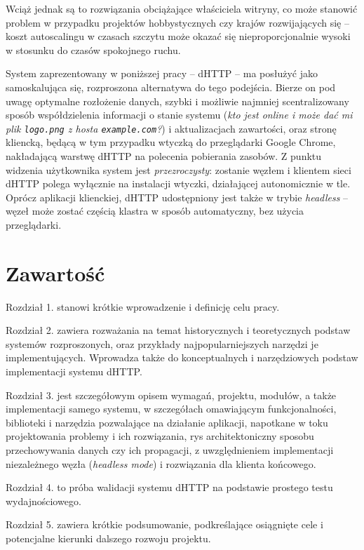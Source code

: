 Wciąż jednak są to rozwiązania obciążające właściciela witryny, co może stanowić problem w przypadku projektów hobbystycznych czy krajów rozwijających się -- koszt autoscalingu w czasach szczytu może okazać się nieproporcjonalnie wysoki w stosunku do czasów spokojnego ruchu.


System zaprezentowany w poniższej pracy -- dHTTP -- ma posłużyć jako samoskalująca się, rozproszona alternatywa do tego podejścia. Bierze on pod uwagę optymalne rozłożenie danych, szybki i możliwie najmniej scentralizowany sposób współdzielenia informacji o stanie systemu ({\em kto jest online i może dać mi plik \texttt{logo.png} z hosta \texttt{example.com}?}) i aktualizacjach zawartości, oraz stronę kliencką, będącą w tym przypadku wtyczką do przeglądarki Google Chrome, nakładającą warstwę dHTTP na polecenia pobierania zasobów. Z punktu widzenia użytkownika system jest {\em przezroczysty}: zostanie  węzłem i klientem sieci dHTTP polega wyłącznie na instalacji wtyczki, działającej autonomicznie w tle. Oprócz aplikacji klienckiej, dHTTP udostępniony jest także w trybie {\em headless} -- węzeł może zostać częścią klastra w sposób automatyczny, bez użycia przeglądarki.

\section{Zawartość}
\label{sec:zawartosc}

Rozdział 1. stanowi krótkie wprowadzenie i definicję celu pracy. 

Rozdział 2. zawiera rozważania na temat historycznych i teoretycznych podstaw systemów rozproszonych, oraz przykłady najpopularniejszych narzędzi je implementujących. Wprowadza także do konceptualnych i narzędziowych podstaw implementacji systemu dHTTP. 

Rozdział 3. jest szczegółowym opisem wymagań, projektu, modułów, a także implementacji samego systemu, w szczegółach omawiającym funkcjonalności, biblioteki i narzędzia pozwalające na działanie aplikacji, napotkane w toku projektowania problemy i ich rozwiązania, rys architektoniczny sposobu przechowywania danych czy ich propagacji, z uwzględnieniem implementacji niezależnego węzła ({\em headless mode}) i rozwiązania dla klienta końcowego.

Rozdział 4. to próba walidacji systemu dHTTP na podstawie prostego testu wydajnościowego.

Rozdział 5. zawiera krótkie podsumowanie, podkreślające osiągnięte cele i potencjalne kierunki dalszego rozwoju projektu.

